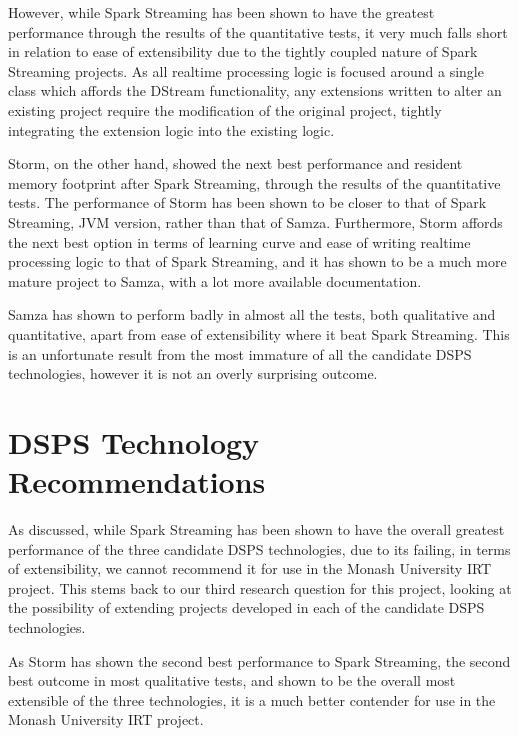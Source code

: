 However, while Spark Streaming has been shown to have the greatest performance through the results of the quantitative
tests, it very much falls short in relation to ease of extensibility due to the tightly coupled nature of Spark Streaming
projects. As all realtime processing logic is focused around a single class which affords the DStream functionality,
any extensions written to alter an existing project require the modification of the original project, tightly integrating the
extension logic into the existing logic.

Storm, on the other hand, showed the next best performance and resident memory footprint after Spark Streaming, through
the results of the quantitative tests. The performance of Storm has been shown to be closer to that of Spark Streaming,
JVM version, rather than that of Samza. Furthermore, Storm affords the next best option in terms of learning curve and
ease of writing realtime processing logic to that of Spark Streaming, and it has shown to be a much more mature project
to Samza, with a lot more available documentation.

Samza has shown to perform badly in almost all the tests, both qualitative and quantitative, apart from ease of extensibility where it beat Spark Streaming.
This is an unfortunate result from the most immature of all the candidate DSPS technologies, however it is not an overly
surprising outcome.



\section{DSPS Technology Recommendations} %
\label{sub:dsps_technology_recommendations}

As discussed, while Spark Streaming has been shown to have the overall greatest performance of the three candidate DSPS
technologies, due to its failing, in terms of extensibility, we cannot recommend it for use in the Monash University IRT
project. This stems back to our third research question for this project, looking at the possibility of extending projects
developed in each of the candidate DSPS technologies.

As Storm has shown the second best performance to Spark Streaming, the second best outcome in most qualitative tests,
and shown to be the overall most extensible of the three technologies, it is a much better contender for use in the Monash
University IRT project.

